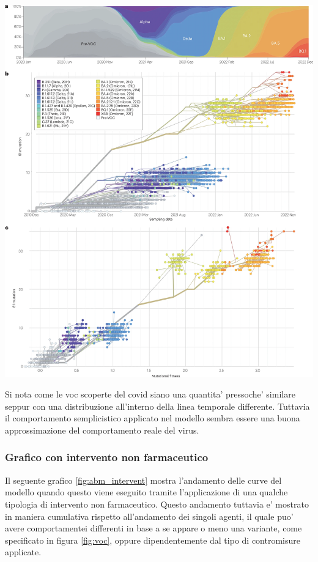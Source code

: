 \begin{minipage}{\linewidth}
	\centering
	\includegraphics[width=\textwidth, height=\textheight]{img/41579_2023_878_Fig3_HTML.png}
	\label{fig:covid_mutation}
\end{minipage}

Si nota come le voc scoperte del covid siano una quantita' pressoche' similare seppur con una 
distribuzione all'interno della linea temporale differente. Tuttavia il comportamento semplicistico 
applicato nel modello sembra essere una buona approssimazione del comportamento reale del virus.

\subsubsection*{Grafico con intervento non farmaceutico}

Il seguente grafico \ref{fig:abm_intervent} mostra l'andamento delle curve del modello
quando questo viene eseguito tramite l'applicazione di una qualche tipologia di intervento non farmaceutico. 
Questo andamento tuttavia e' mostrato in maniera cumulativa rispetto all'andamento dei singoli agenti, il quale puo' avere comportamentei 
differenti in base a se appare o meno una variante, come specificato in figura \ref{fig:voc}, oppure 
dipendentemente dal tipo di contromisure applicate. 

